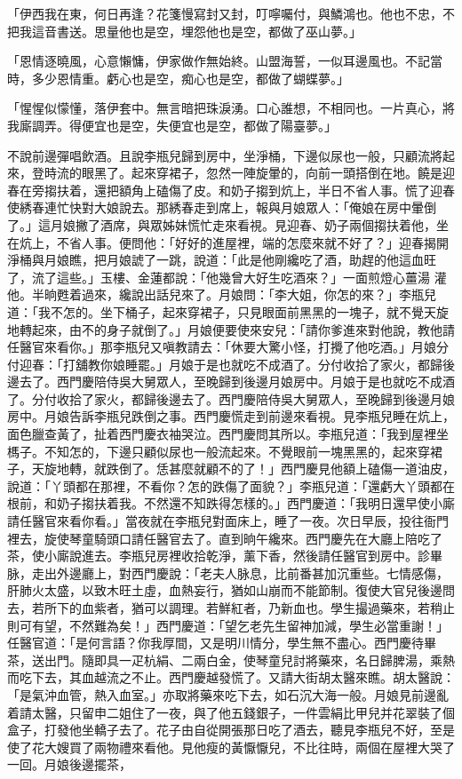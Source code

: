 「伊西我在東，何日再逢？花箋慢寫封又封，叮嚀囑付，與鱗鴻也。他也不忠，不把我這音書送。思量他也是空，埋怨他也是空，都做了巫山夢。」

「恩情逐曉風，心意懶慵，伊家做作無始終。山盟海誓，一似耳邊風也。不記當時，多少恩情重。虧心也是空，痴心也是空，都做了蝴蝶夢。」

「惺惺似懞懂，落伊套中。無言暗把珠淚湧。口心誰想，不相同也。一片真心，將我廝調弄。得便宜也是空，失便宜也是空，都做了陽臺夢。」

不說前邊彈唱飲酒。且說李瓶兒歸到房中，坐淨桶，下邊似尿也一般，只顧流將起來，登時流的眼黑了。起來穿裙子，忽然一陣旋暈的，向前一頭搭倒在地。饒是迎春在旁搊扶着，還把額角上磕傷了皮。和奶子搊到炕上，半日不省人事。慌了迎春使綉春連忙快對大娘說去。那綉春走到席上，報與月娘眾人：「俺娘在房中暈倒了。」這月娘撇了酒席，與眾姊妹慌忙走來看視。見迎春、奶子兩個搊扶着他，坐在炕上，不省人事。便問他：「好好的進屋裡，端的怎麼來就不好了？」迎春揭開淨桶與月娘瞧，把月娘諕了一跳，說道：「此是他剛纔吃了酒，助趕的他這血旺了，流了這些。」玉樓、金蓮都說：「他幾曾大好生吃酒來？」一面煎燈心薑湯 灌他。半晌甦着過來，纔說出話兒來了。月娘問：「李大姐，你怎的來？」李瓶兒道：「我不怎的。坐下桶子，起來穿裙子，只見眼面前黑黑的一塊子，就不覺天旋地轉起來，由不的身子就倒了。」月娘便要使來安兒：「請你爹進來對他說，教他請任醫官來看你。」那李瓶兒又嗔教請去：「休要大驚小怪，打攪了他吃酒。」月娘分付迎春：「打舖教你娘睡罷。」月娘于是也就吃不成酒了。分付收拾了家火，都歸後邊去了。西門慶陪侍吳大舅眾人，至晚歸到後邊月娘房中。月娘于是也就吃不成酒了。分付收拾了家火，都歸後邊去了。西門慶陪侍吳大舅眾人，至晚歸到後邊月娘房中。月娘告訴李瓶兒跌倒之事。西門慶慌走到前邊來看視。見李瓶兒睡在炕上，面色臘查黃了，扯着西門慶衣袖哭泣。西門慶問其所以。李瓶兒道：「我到屋裡坐榪子。不知怎的，下邊只顧似尿也一般流起來。不覺眼前一塊黑黑的，起來穿裙子，天旋地轉，就跌倒了。恁甚麼就顧不的了！」西門慶見他額上磕傷一道油皮，說道：「丫頭都在那裡，不看你？怎的跌傷了面貌？」李瓶兒道：「還虧大丫頭都在根前，和奶子搊扶着我。不然還不知跌得怎樣的。」西門慶道：「我明日還早使小廝請任醫官來看你看。」當夜就在李瓶兒對面床上，睡了一夜。次日早辰，投往衙門裡去，旋使琴童騎頭口請任醫官去了。直到晌午纔來。西門慶先在大廳上陪吃了茶，使小廝說進去。李瓶兒房裡收拾乾淨，薰下香，然後請任醫官到房中。診畢脉，走出外邊廳上，對西門慶說：「老夫人脉息，比前番甚加沉重些。七情感傷，肝肺火太盛，以致木旺土虛，血熱妄行，猶如山崩而不能節制。復使大官兒後邊問去，若所下的血紫者，猶可以調理。若鮮紅者，乃新血也。學生撮過藥來，若稍止則可有望，不然難為矣！」西門慶道：「望乞老先生留神加減，學生必當重謝！」任醫官道：「是何言語？你我厚間，又是明川情分，學生無不盡心。西門慶待畢茶，送出門。隨即具一疋杭絹、二兩白金，使琴童兒討將藥來，名日歸脾湯，乘熱而吃下去，其血越流之不止。西門慶越發慌了。又請大街胡太醫來瞧。胡太醫說：「是氣沖血管，熱入血室。」亦取將藥來吃下去，如石沉大海一般。月娘見前邊亂着請太醫，只留申二姐住了一夜，與了他五錢銀子，一件雲絹比甲兒并花翠裝了個盒子，打發他坐轎子去了。花子由自從開張那日吃了酒去，聽見李瓶兒不好，至是使了花大嫂買了兩物禮來看他。見他瘦的黃懨懨兒，不比往時，兩個在屋裡大哭了一回。月娘後邊擺茶，